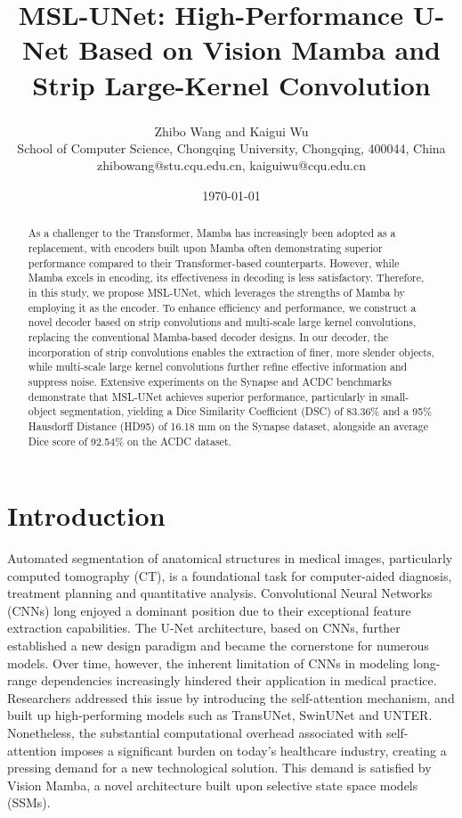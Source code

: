 \documentclass[10pt, a4paper, twocolumn]{article}
\title{MSL-UNet: High-Performance U-Net Based on Vision Mamba and Strip Large-Kernel Convolution}
\author{Zhibo Wang and Kaigui Wu\textsuperscript{\Letter} \\ School of Computer Science, Chongqing University, Chongqing, 400044, China\\zhibowang@stu.cqu.edu.cn, kaiguiwu@cqu.edu.cn}
\date{\today}
\begin{document}
\maketitle

\begin{abstract}

As a challenger to the Transformer, Mamba has increasingly been adopted as a replacement, with encoders built upon Mamba often demonstrating superior performance compared to their Transformer-based counterparts. However, while Mamba excels in encoding, its effectiveness in decoding is less satisfactory. Therefore, in this study, we propose MSL-UNet, which leverages the strengths of Mamba by employing it as the encoder. To enhance efficiency and performance, we construct a novel decoder based on strip convolutions and multi-scale large kernel convolutions, replacing the conventional Mamba-based decoder designs. In our decoder, the incorporation of strip convolutions enables the extraction of finer, more slender objects, while multi-scale large kernel convolutions further refine effective information and suppress noise.  Extensive experiments on the Synapse and ACDC benchmarks demonstrate that MSL-UNet achieves superior performance, particularly in small-object segmentation, yielding a Dice Similarity Coefficient (DSC) of 83.36\% and a 95\% Hausdorff Distance (HD95) of 16.18 mm on the Synapse dataset, alongside an average Dice score of 92.54\% on the ACDC dataset.
    

\end{abstract}





\section{Introduction}

Automated segmentation of anatomical structures in medical images, particularly computed tomography (CT), is a foundational task for computer-aided diagnosis, treatment planning and quantitative analysis\cite{ronneberger2015unet,isensee2021nnu,milletari2016vnet}. Convolutional Neural Networks (CNNs) long enjoyed a dominant position due to their exceptional feature extraction capabilities. The U-Net architecture, based on CNNs, further established a new design paradigm and became the cornerstone for numerous models. Over time, however, the inherent limitation of CNNs in modeling long-range dependencies increasingly hindered their application in medical practice. Researchers addressed this issue by introducing the self-attention mechanism, and built up high-performing models such as TransUNet\cite{chen2021transunet}, SwinUNet\cite{cao2021swinunet} and UNTER\cite{hatamizadeh2022unetr}. Nonetheless, the substantial computational overhead associated with self-attention imposes a significant burden on today's healthcare industry, creating a pressing demand for a new technological solution. This demand is satisfied by Vision Mamba, a novel architecture built upon selective state space models (SSMs)\cite{gu2023mamba,liu2024vmamba,zhu2024vim}.
\end{document}
